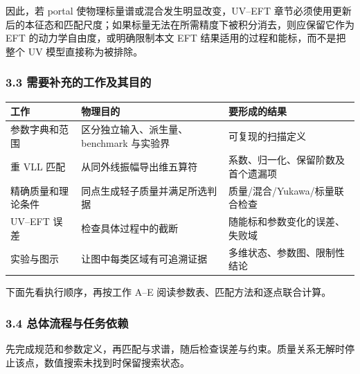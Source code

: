 \documentclass[
  chinese,
  UTF8]{ctexart}
\newcounter{none} %
\begin{document}
因此，若 portal 使物理标量谱或混合发生明显改变，UV--EFT
章节必须使用更新后的本征态和匹配尺度；如果标量无法在所需精度下被积分消去，则应保留它作为
EFT 的动力学自由度，或明确限制本文 EFT
结果适用的过程和能标，而不是把整个 UV 模型直接称为被排除。

\subsubsection{3.3 需要补充的工作及其目的}\label{major-2-step-3}

{\def\LTcaptype{none} %
\begin{longtable}[]{@{}
  >{\raggedright\arraybackslash}p{}
  >{\raggedright\arraybackslash}p{}
  >{\raggedright\arraybackslash}p{}@{}}
\toprule\noalign{}
\begin{minipage}[b]{\linewidth}\raggedright
工作
\end{minipage} & \begin{minipage}[b]{\linewidth}\raggedright
物理目的
\end{minipage} & \begin{minipage}[b]{\linewidth}\raggedright
要形成的结果
\end{minipage} \\
\midrule\noalign{}
\endhead
\bottomrule\noalign{}
\endlastfoot
参数字典和范围 & 区分独立输入、派生量、benchmark 与实验界 &
可复现的扫描定义 \\
重 VLL 匹配 & 从同外线振幅导出维五算符 &
系数、归一化、保留阶数及首个遗漏项 \\
精确质量和理论条件 & 同点生成轻子质量并满足所选判据 &
质量/混合/Yukawa/标量联合检查 \\
UV--EFT 误差 & 检查具体过程中的截断 & 随能标和参数变化的误差、失败域 \\
实验与图示 & 让图中每类区域有可追溯证据 &
多维状态、参数图、限制性结论 \\
\end{longtable}
}

下面先看执行顺序，再按工作 A--E 阅读参数表、匹配方法和逐点联合计算。

\subsubsection{3.4 总体流程与任务依赖}\label{major-2-step-4}

先完成规范和参数定义，再匹配与求谱，随后检查误差与约束。质量关系无解时停止该点，数值搜索未找到时保留搜索状态。
\end{document}
